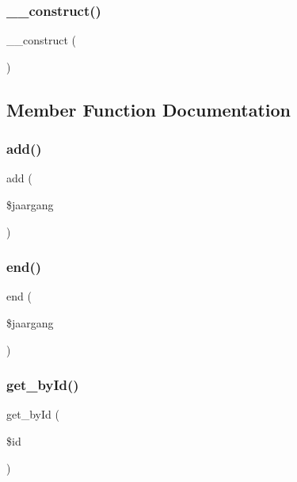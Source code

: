 \subsubsection{\texorpdfstring{\+\_\+\+\_\+construct()}{\_\_construct()}}
{\footnotesize\ttfamily \+\_\+\+\_\+construct (\begin{DoxyParamCaption}{ }\end{DoxyParamCaption})}



\subsection{Member Function Documentation}
\mbox{\label{class_jaargang__model_a85632de012fc6908d7099ed42afd5fe2}} 
\subsubsection{\texorpdfstring{add()}{add()}}
{\footnotesize\ttfamily add (\begin{DoxyParamCaption}\item[{}]{\$jaargang }\end{DoxyParamCaption})}

\mbox{\label{class_jaargang__model_a696e5350ea9e59a460530ab447486539}} 
\subsubsection{\texorpdfstring{end()}{end()}}
{\footnotesize\ttfamily end (\begin{DoxyParamCaption}\item[{}]{\$jaargang }\end{DoxyParamCaption})}

\mbox{\label{class_jaargang__model_a98d28a4d9a29d40c5a8aa0176f19a919}} 
\subsubsection{\texorpdfstring{get\+\_\+by\+Id()}{get\_byId()}}
{\footnotesize\ttfamily get\+\_\+by\+Id (\begin{DoxyParamCaption}\item[{}]{\$id }\end{DoxyParamCaption})}

